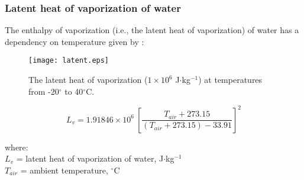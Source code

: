 \subsubsection{Latent heat of vaporization of water}
\label{sec:latent}
The enthalpy of vaporization (i.e., the latent heat of vaporization) of water has a dependency on temperature given by \parencite[Eq. 8]{henderson84}:

\begin{figure}[ht!]
    \texttt{[image: latent.eps]}
    \caption{The latent heat of vaporization ($1\times 10^6$ J$\cdot$kg$^{-1}$) at temperatures from -20$^{\circ}$ to 40$^{\circ}$C.}
    \label{fig:latent}
\end{figure}

\begin{equation}
\label{eq:latent}
	L_v = 1.91846\times 10^6\: \left[
		\frac{T_{air} + 273.15}{\left(T_{air} + 273.15\right) - 33.91}
	\right]^2
\end{equation}

\noindent where: \\
\indent $L_v$ = latent heat of vaporization of water, J$\cdot$kg$^{-1}$\\
\indent $T_{air}$ = ambient temperature, $^{\circ}$C\\

